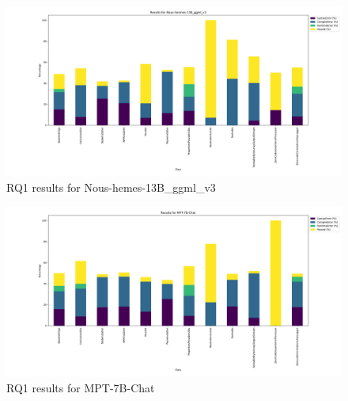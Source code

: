 \begin{figure}
\centering
\includegraphics[width=1\textwidth]{images/RQ1_nous.png}
\caption{RQ1 results for Nous-hemes-13B\_ggml\_v3}
\label{fig:rq1_nous}
\end{figure}

\begin{figure}
\centering
\includegraphics[width=1\textwidth]{images/RQ1_mpt.png}
\caption{RQ1 results for MPT-7B-Chat}
\label{fig:rq1_mpt}
\end{figure}

